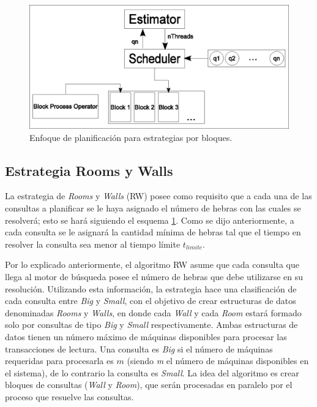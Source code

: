 \begin{figure}[!th]
\centering
\includegraphics[scale=.75]{images/scheduler_bloques.eps}
\caption{Enfoque de planificación para estrategias por bloques.}
\label{fig:schedulerbloques}
\end{figure}  


\subsection{Estrategia Rooms y Walls}
\label{scheduling:fr}
La estrategia de \textit{Rooms} y \textit{Walls} (RW) posee como requisito que a cada una de las consultas a planificar se le haya asignado el número de hebras con las cuales se resolverá; esto se hará siguiendo el esquema \ref{fig:schedulerbloques}. Como se dijo anteriormente, a cada consulta se le asignará la cantidad mínima de hebras tal que el tiempo en resolver la consulta sea menor al tiempo límite $t_{limite}$.

Por lo explicado anteriormente, el algoritmo RW asume que cada consulta que llega al motor de búsqueda posee el número de hebras que debe utilizarse en su resolución. Utilizando esta información, la estrategia hace una clasificación de cada consulta entre \textit{Big} y \textit{Small}, con el objetivo de crear estructuras de datos denominadas \textit{Rooms} y \textit{Walls}, en donde cada \textit{Wall} y cada \textit{Room} estará formado solo por consultas de tipo \textit{Big} y \textit{Small} respectivamente. Ambas estructuras de datos tienen un número máximo de máquinas disponibles para procesar las transacciones de lectura. Una consulta es \textit{Big} si el número de máquinas requeridas para procesarla es $m$ (siendo \textit{m} el número de máquinas disponibles en el sistema), de lo contrario la consulta es \textit{Small}. La idea del algoritmo es crear bloques de consultas (\textit{Wall} y \textit{Room}), que serán procesadas en paralelo por el proceso que resuelve las consultas. 


